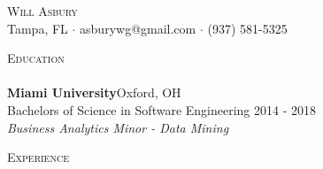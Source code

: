 \documentclass[a4paper]{article}
\newcommand{\lineunder} {
    \vspace*{-8pt} \\
    \hspace*{-18pt} \hrulefill \\
}
\newcommand{\header} [1] {
    {\hspace*{-18pt}\vspace*{6pt} \textsc{#1}}
    \vspace*{-6pt} \lineunder
}
\begin{document}
\vspace*{-40pt}

    

\vspace*{-10pt}
\begin{center}
	{\Huge \scshape {Will Asbury}}\\
	Tampa, FL $\cdot$ asburywg@gmail.com $\cdot$ (937) 581-5325\\
\end{center}

\header{Education}
\textbf{Miami University}\hfill Oxford, OH\\
Bachelors of Science in Software Engineering \hfill 2014 - 2018\\
\textit{Business Analytics Minor - Data Mining}\\
\vspace{3mm}

\header{Experience}
\vspace{1mm}
\end{document}
